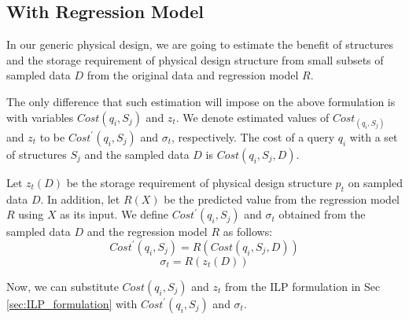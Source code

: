 \documentclass[10pt]{article}
\begin{document}
\subsection{With Regression Model}
In our generic physical design, we are going to estimate the benefit of structures and the
storage requirement of physical design structure from small subsets of sampled data $D$ from the
original data and regression model $R$.

The only difference that such estimation will impose on the above formulation is with variables
$Cost(q_i, S_j)$ and $z_{t}$.
We denote estimated values of $Cost_(q_i, S_j)$ and $z_{t}$ to be $Cost^\prime(q_i, S_j)$ and
$\sigma_{t}$, respectively.
The cost of a query $q_i$ with a set of structures $S_j$ and the sampled data $D$ is
$Cost(q_i, S_j, D)$.

Let $z_t (D)$ be the storage requirement of physical design structure $p_t$ on sampled data $D$.
In addition, let $R(X)$ be the predicted value from the regression model $R$ using $X$ as its input.
We define $Cost^\prime (q_i,S_j)$ and $\sigma_{t}$ obtained from the sampled data $D$ and
the regression model $R$ as follows:
\begin{equation}
  Cost^\prime (q_i,S_j) = R(Cost(q_i, S_j, D))
  \label{eq:regress1}
\end{equation}
\begin{equation}
  \sigma_{t} = R(z_t (D))
\end{equation}

Now, we can substitute $Cost(q_i,S_j)$ and $z_t$ from the ILP formulation in
Sec \ref{sec:ILP_formulation} with $Cost^\prime (q_i,S_j)$ and $\sigma_{t}$.



\end{document}
